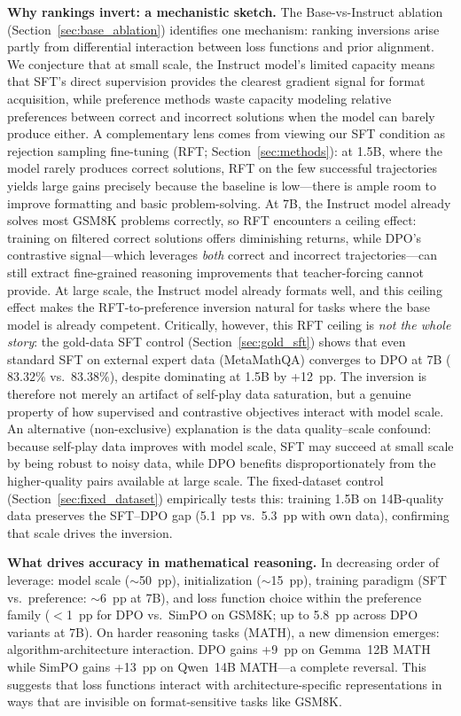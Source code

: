 \documentclass{article}
\begin{document}
\textbf{Why rankings invert: a mechanistic sketch.}
The Base-vs-Instruct ablation (Section~\ref{sec:base_ablation}) identifies one mechanism: ranking inversions arise partly from differential interaction between loss functions and prior alignment. We conjecture that at small scale, the Instruct model's limited capacity means that SFT's direct supervision provides the clearest gradient signal for format acquisition, while preference methods waste capacity modeling relative preferences between correct and incorrect solutions when the model can barely produce either. A complementary lens comes from viewing our SFT condition as rejection sampling fine-tuning (RFT; Section~\ref{sec:methods}): at 1.5B, where the model rarely produces correct solutions, RFT on the few successful trajectories yields large gains precisely because the baseline is low---there is ample room to improve formatting and basic problem-solving. At 7B, the Instruct model already solves most GSM8K problems correctly, so RFT encounters a ceiling effect: training on filtered correct solutions offers diminishing returns, while DPO's contrastive signal---which leverages \emph{both} correct and incorrect trajectories---can still extract fine-grained reasoning improvements that teacher-forcing cannot provide. At large scale, the Instruct model already formats well, and this ceiling effect makes the RFT-to-preference inversion natural for tasks where the base model is already competent. Critically, however, this RFT ceiling is \emph{not the whole story}: the gold-data SFT control (Section~\ref{sec:gold_sft}) shows that even standard SFT on external expert data (MetaMathQA) converges to DPO at 7B ($83.32\%$ vs.\ $83.38\%$), despite dominating at 1.5B by +12~pp. The inversion is therefore not merely an artifact of self-play data saturation, but a genuine property of how supervised and contrastive objectives interact with model scale. An alternative (non-exclusive) explanation is the data quality--scale confound: because self-play data improves with model scale, SFT may succeed at small scale by being robust to noisy data, while DPO benefits disproportionately from the higher-quality pairs available at large scale. The fixed-dataset control (Section~\ref{sec:fixed_dataset}) empirically tests this: training 1.5B on 14B-quality data preserves the SFT--DPO gap (5.1~pp vs.\ 5.3~pp with own data), confirming that scale drives the inversion.

\textbf{What drives accuracy in mathematical reasoning.}
In decreasing order of leverage: model scale (${\sim}$50~pp), initialization (${\sim}$15~pp), training paradigm (SFT vs.\ preference: ${\sim}$6~pp at 7B), and loss function choice within the preference family ($<$1~pp for DPO vs.\ SimPO on GSM8K; up to 5.8~pp across DPO variants at 7B).
On harder reasoning tasks (MATH), a new dimension emerges: algorithm-architecture interaction. DPO gains +9~pp on Gemma~12B MATH while SimPO gains +13~pp on Qwen~14B MATH---a complete reversal. This suggests that loss functions interact with architecture-specific representations in ways that are invisible on format-sensitive tasks like GSM8K.
\end{document}
